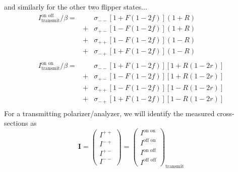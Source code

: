 \documentclass[12pt,letterpaper]{article}
\begin{document}
and similarly for the other two flipper states...
\begin{equation}
\begin{array}{rll}
	I^{\textrm{on off}}_\textrm{transmit} / \beta =& {} & \sigma_{--} [1 + F(1-2f)](1 + R) \\
	 {} & + & \sigma_{+-} [1 - F(1-2f)](1 + R) \\
	 {} & + & \sigma_{++} [1 - F(1-2f)](1 - R) \\
	 {} & + & \sigma_{-+} [1 + F(1-2f)](1 - R) \\
	 {} & {} & {} \\
	 I^{\textrm{on on}}_\textrm{transmit} / \beta =& {} & \sigma_{--} [1 + F(1-2f)][1 + R(1-2r)] \\
	 {} & + & \sigma_{+-} [1 - F(1-2f)][1 + R(1-2r)] \\
	 {} & + & \sigma_{++} [1 - F(1-2f)][1 - R(1-2r)] \\
	 {} & + & \sigma_{-+} [1 + F(1-2f)][1 - R(1-2r)] \\
\end{array}
\end{equation}
For a transmitting polarizer/analyzer, we will identify the measured cross-sections as 
\begin{equation}
	\mathbf{I} = 
	\begin{pmatrix}
		I^{++} \\
		I^{-+} \\
		I^{+-} \\
		I^{--} 
	\end{pmatrix}
	= 
	\begin{pmatrix}
		I^\textrm{on on} \\
		I^\textrm{off on} \\
		I^\textrm{on off} \\
		I^\textrm{off off} 
	\end{pmatrix}_\textrm{transmit}
\end{equation}
\end{document}
